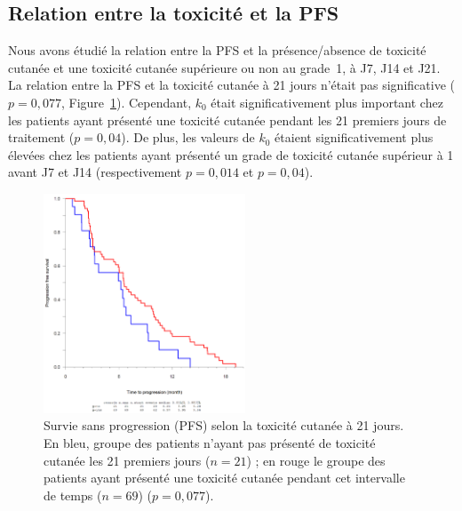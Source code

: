 \subsection{Relation entre la toxicité et la PFS}
Nous avons étudié la relation entre la PFS et la présence/absence de toxicité cutanée et une toxicité cutanée supérieure ou non au grade~1, à J7, J14 et J21. La relation entre la PFS et la toxicité cutanée à 21 jours n'était pas significative ($p = 0,077$, Figure~\ref{fig:28}).
Cependant, $k_0$ était significativement plus important chez les patients ayant présenté une toxicité cutanée pendant les 21 premiers jours de traitement ($p = 0,04$). De plus, les valeurs de $k_0$ étaient significativement plus élevées chez les patients ayant présenté un grade de toxicité cutanée supérieur à 1 avant J7 et J14 (respectivement $p = 0,014$ et $p = 0,04$).
\begin{figure}[htbp]
	\centering
		\includegraphics[width=6cm]{figures/raster/FIG_28}
	\caption{Survie sans progression (PFS) selon la toxicité cutanée à 21 jours. En bleu, groupe des patients n'ayant pas présenté de toxicité cutanée les 21 premiers jours ($n = 21$) ; en rouge le groupe des patients ayant présenté une toxicité cutanée pendant cet intervalle de temps ($n = 69$) ($p = 0,077$).}
	\label{fig:28}
\end{figure}

